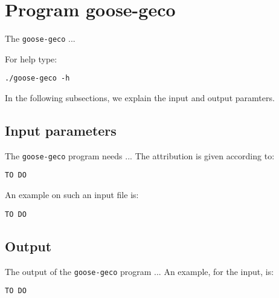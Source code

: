 \section{Program goose-geco}
The \texttt{goose-geco} ...

For help type:
\begin{lstlisting}
./goose-geco -h
\end{lstlisting}
In the following subsections, we explain the input and output paramters.

\subsection{Input parameters}

The \texttt{goose-geco} program needs ...
The attribution is given according to:
\begin{lstlisting}
TO DO
\end{lstlisting}

An example on such an input file is:
\begin{lstlisting}
TO DO
\end{lstlisting}

\subsection{Output}
The output of the \texttt{goose-geco} program ...
An example, for the input, is:
\begin{lstlisting}
TO DO
\end{lstlisting}